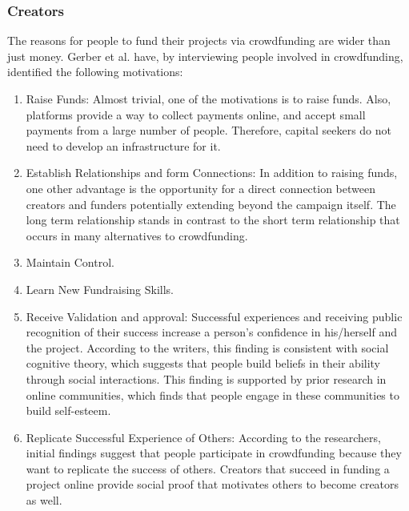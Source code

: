 \subsubsection*{Creators}
The reasons for people to fund their projects via crowdfunding are wider than just money. Gerber et al. \cite{inproceedings} 
have, by interviewing people involved in crowdfunding, identified the following motivations:
\begin{enumerate}
      \item Raise Funds: 
            Almost trivial, one of the motivations is to raise funds. Also, platforms provide a way to
            collect payments online, and accept small payments from a large number of people. Therefore, capital
            seekers do not need to develop an infrastructure for it.

      \item Establish Relationships and form Connections:        
            In addition to raising funds, one other advantage is the opportunity for a direct connection between creators and funders potentially extending beyond the campaign itself. The
            long term relationship stands in contrast to the short term relationship that occurs in many alternatives
            to crowdfunding.

      \item Maintain Control.

      \item Learn New Fundraising Skills.

      \item Receive Validation and approval:           
            Successful experiences and receiving public recognition of their success increase
            a person’s confidence in his/herself and the project. According to the writers, this finding is consistent
            with social cognitive theory, which suggests that people build beliefs in their ability through social interactions. This finding is supported by prior research in online communities, which finds that people
            engage in these communities to build self-esteem.

      \item Replicate Successful Experience of Others:          
            According to the researchers, initial findings suggest that
            people participate in crowdfunding because they want to replicate the success of others. Creators that
            succeed in funding a project online provide social proof that motivates others to become creators as
            well.


\end{enumerate}
